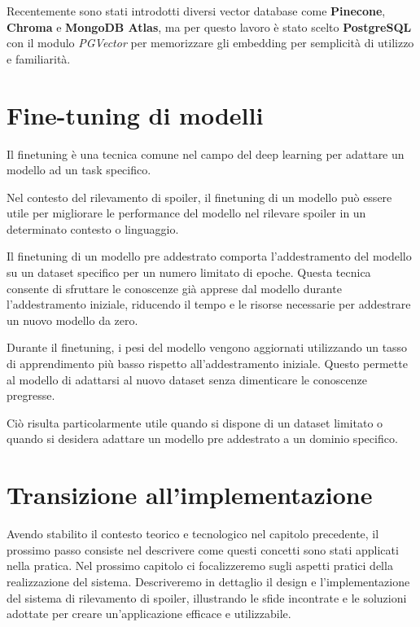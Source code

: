 Recentemente sono stati introdotti diversi vector database
come \textbf{Pinecone}, \textbf{Chroma} e \textbf{MongoDB
  Atlas}, ma per questo lavoro è stato scelto
\textbf{PostgreSQL} con il modulo \textit{PGVector} per
memorizzare gli embedding per semplicità di utilizzo e
familiarità.

\section{Fine-tuning di modelli}
\label{sec:finetuning-di-modelli}

Il finetuning è una tecnica comune nel campo del deep
learning per adattare un modello ad un task specifico.

Nel contesto del rilevamento di spoiler, il finetuning di
un modello può essere utile per migliorare le performance
del modello nel rilevare spoiler in un determinato contesto
o linguaggio.

Il finetuning di un modello pre addestrato comporta
l'addestramento del modello su un dataset specifico per un
numero limitato di epoche.
Questa tecnica consente di sfruttare le conoscenze già
apprese dal modello durante l'addestramento iniziale,
riducendo il tempo e le risorse necessarie per addestrare
un nuovo modello da zero.

Durante il finetuning, i pesi del modello vengono
aggiornati utilizzando un tasso di apprendimento più basso
rispetto all'addestramento iniziale.
Questo permette al modello di adattarsi al nuovo dataset
senza dimenticare le conoscenze pregresse.

Ciò risulta particolarmente utile quando si dispone di un
dataset limitato o quando si desidera adattare un modello
pre addestrato a un dominio specifico.

\newpage
\section{Transizione all'implementazione}
\label{sec:transizione-implementazione}
Avendo stabilito il contesto teorico e tecnologico nel
capitolo precedente, il prossimo passo consiste nel
descrivere come questi concetti sono stati applicati nella
pratica.
Nel prossimo capitolo ci focalizzeremo sugli aspetti
pratici della realizzazione del sistema.
Descriveremo in dettaglio il design e l'implementazione del
sistema di rilevamento di spoiler, illustrando le sfide
incontrate e le soluzioni adottate per creare
un'applicazione efficace e utilizzabile.
